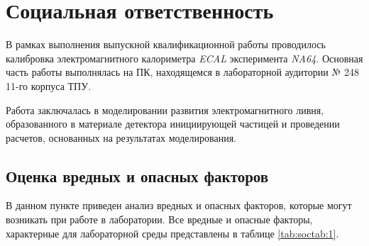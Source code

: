 \newpage
\section{Социальная ответственность}  \label{socchap:1} 

В   рамках выполнения выпускной   квалификационной   работы проводилось калибровка электромагнитного калориметра \textit{ECAL} эксперимента \textit{NA64}. Основная  часть  работы  выполнялась  на  ПК, находящемся в лабораторной аудитории № 248 11-го корпуса ТПУ. 

Работа  заключалась  в  моделировании  развития  электромагнитного ливня,  образованного  в  материале  детектора  инициирующей  частицей  и проведении расчетов, основанных на результатах моделирования.

\subsection{Оценка вредных и опасных факторов}  \label{socsec:1} 

В данном пункте приведен анализ вредных и опасных факторов, которые могут возникать при работе в лаборатории. Все вредные и опасные факторы, характерные для лабораторной среды представлены в таблице \ref{tab:soctab:1}.

